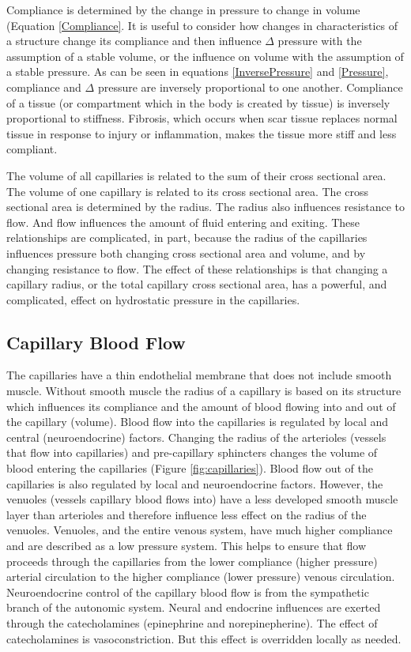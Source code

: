 Compliance is determined by the change in pressure to change in volume (Equation \ref{Compliance}. It is useful to consider how changes in characteristics of a structure change its compliance and then influence $\Delta$ pressure with the assumption of a stable volume, or the influence on volume with the assumption of a stable pressure. As can be seen in equations \ref{InversePressure} and \ref{Pressure}, compliance and $\Delta$ pressure are inversely proportional to one another. Compliance of a tissue (or compartment which in the body is created by tissue) is inversely proportional to stiffness. Fibrosis, which occurs when scar tissue replaces normal tissue in response to injury or inflammation, makes the tissue more stiff and less compliant.

The volume of all capillaries is related to the sum of their cross sectional area. The volume of one capillary is related to its cross sectional area. The cross sectional area is determined by the radius. The radius also influences resistance to flow. And flow influences the amount of fluid entering and exiting. These relationships are complicated, in part, because the radius of the capillaries influences pressure both changing cross sectional area and volume, and by changing resistance to flow. The effect of these relationships is that changing a capillary radius, or the total capillary cross sectional area, has a powerful, and complicated, effect on hydrostatic pressure in the capillaries.


\subsection{Capillary Blood Flow}

The capillaries have a thin endothelial membrane that does not include smooth muscle. Without smooth muscle the radius of a capillary is based on its structure which influences its compliance and the amount of blood flowing into and out of the capillary (volume). Blood flow into the capillaries is regulated by local and central (neuroendocrine) factors. Changing the radius of the arterioles (vessels that flow into capillaries) and pre-capillary sphincters changes the volume of blood entering the capillaries (Figure \ref{fig:capillaries}). Blood flow out of the capillaries is also regulated by local and neuroendocrine factors. However, the venuoles (vessels capillary blood flows into) have a less developed smooth muscle layer than arterioles and therefore influence less effect on the radius of the venuoles. Venuoles, and the entire venous system, have much higher compliance and are described as a low pressure system. This helps to ensure that flow proceeds through the capillaries from the lower compliance (higher pressure) arterial circulation to the higher compliance (lower pressure) venous circulation. Neuroendocrine control of the capillary blood flow is from the sympathetic branch of the autonomic system. Neural and endocrine influences are exerted through the catecholamines (epinephrine and norepinepherine). The effect of catecholamines is vasoconstriction. But this effect is overridden locally as needed. 

